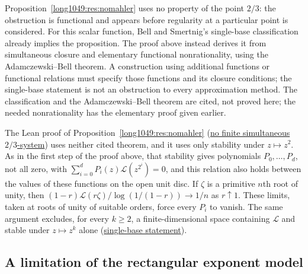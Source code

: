 \documentclass[11pt]{article}
\newcommand{\latecommit}{035c414b25fda09ae0d2e56358b8716d321ebd99}
\newcommand{\laterepobase}{https://github.com/wcook04/plectis-erdos/blob/\latecommit}
\begin{document}
Proposition~\ref{long1049:res:nomahler} uses no property of the point
$2/3$: the obstruction is functional and appears before regularity at a particular point is considered.
For this scalar function, Bell and Smertnig's single-base classification
already implies the proposition. The proof above instead derives it
from simultaneous closure and elementary functional nonrationality,
using the Adamczewski--Bell theorem.  A
construction using additional functions or functional relations must specify
those functions and its closure conditions; the single-base statement is not
an obstruction to every approximation method. The classification and the
Adamczewski--Bell theorem are cited, not proved here; the needed
nonrationality has the elementary proof given earlier.

The Lean proof of Proposition~\ref{long1049:res:nomahler}
(\href{\laterepobase/lean/ErdosProblems/Erdos1049/PaperCompleteR21/SimultaneousMahlerSystemUnconditional.lean\#L298}{no finite simultaneous $2/3$-system})
uses neither cited theorem, and it uses only stability under
$z\mapsto z^2$. As in the first step of the proof above, that stability
gives polynomials $P_0,\dots,P_d$, not all zero, with
$\sum_{i=0}^{d}P_i(z)\mathcal L(z^{2^i})=0$, and this relation also holds
between the values of these functions on the open unit disc. If $\zeta$ is
a primitive $n$th root of unity, then
$(1-r)\mathcal L(r\zeta)/\log(1/(1-r))\to1/n$ as $r\uparrow1$.
These limits, taken at roots of unity of suitable orders, force every
$P_i$ to vanish. The same argument excludes, for every $k\ge2$, a
finite-dimensional space containing $\mathcal L$ and stable under
$z\mapsto z^k$ alone
(\href{\laterepobase/lean/ErdosProblems/Erdos1049/PaperCompleteR21/SimultaneousMahlerSystemUnconditional.lean\#L263}{single-base statement}).

\subsection{A limitation of the rectangular exponent model}
\end{document}
